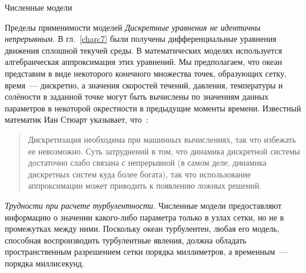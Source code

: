 \begin{chapter}{Численные модели}
\begin{section}{Пределы применимости моделей}
\emph{Дискретные уравнения не идентичны непрерывным.}  
В гл.~\ref{chap:7} были получены дифференциальные уравнения движения 
сплошной текучей среды. В математических моделях используется алгебраическая
аппроксимация этих уравнений. Мы предполагаем, что океан представим в виде
некоторого конечного множества точек, образующих сетку, время~--- дискретно,
а значения скоростей течений, давления, температуры и солёности в заданной 
точке могут быть вычислены по значениям данных параметров в некоторой 
окрестности в предыдущие моменты времени. Известный математик 
Иан Стюарт указывает, что~\cite{Stewart:1992}:
%
\begin{quote}
Дискретизация необходима при машинных вычислениях, так что избежать ее 
невозможно. Суть затруднений в том, что динамика дискретной системы
достаточно слабо связана с непрерывной (в самом деле, динамика дискретных
систем куда более богата), так что использование аппроксимации может приводить 
к появлению ложных решений.
%
\end{quote}

\emph{Трудности при расчете турбулентности.}  
Численные модели предоставляют информацию о значении какого-либо
параметра только в узлах сетки, но не в промежутках между ними. 
Поскольку океан турбулентен, любая его модель, способная воспроизводить
турбулентные явления, должна обладать пространственным разрешением сетки 
порядка миллиметров, а временным~--- порядка миллисекунд.
%


\end{section}
\end{chapter}
